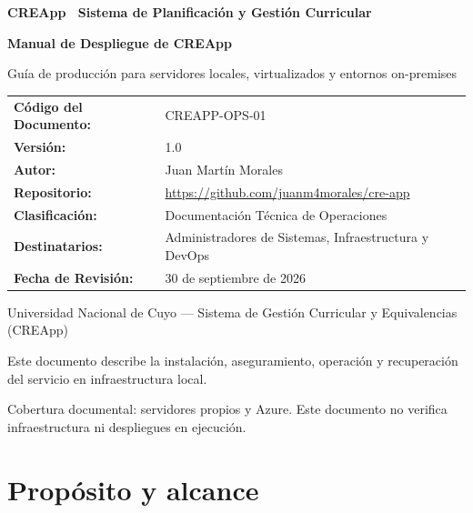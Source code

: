 \documentclass[10pt,a4paper,oneside]{article}
\begin{document}
\begin{titlepage}
\thispagestyle{empty}
\vspace*{1.5cm}
{\Large\bfseries\color{CREBlue} CREApp \textbar\ Sistema de Planificación y Gestión Curricular\par}
\vspace{1.2cm}
{\Huge\bfseries Manual de Despliegue de CREApp\par}
\vspace{0.6cm}
{\large\color{black!80} Guía de producción para servidores locales, virtualizados y entornos on-premises\par}
\vspace{1.0cm}
\noindent{\color{CREBlue}\rule{\textwidth}{1.5pt}}
\vspace{1.0cm}

\begin{table}[h]
\centering
\begin{tabular}{ll}
\toprule
\textbf{Código del Documento:} & CREAPP-OPS-01 \\
\textbf{Versión:} & 1.0 \\
\textbf{Autor:} & Juan Martín Morales \\
\textbf{Repositorio:} & \url{https://github.com/juanm4morales/cre-app} \\
\textbf{Clasificación:} & Documentación Técnica de Operaciones \\
\textbf{Destinatarios:} & Administradores de Sistemas, Infraestructura y DevOps \\
\textbf{Fecha de Revisión:} & 30 de septiembre de 2026 \\
\bottomrule
\end{tabular}
\end{table}

\vfill
{\small\color{black!70}
Universidad Nacional de Cuyo --- Sistema de Gestión Curricular y Equivalencias (CREApp)\par
Este documento describe la instalación, aseguramiento, operación y recuperación del servicio en infraestructura local.
\par\vspace{0.25em}
Cobertura documental: servidores propios y Azure. Este documento no verifica infraestructura ni despliegues en ejecución.
}
\end{titlepage}
\tableofcontents
\clearpage
{}
\section*{Propósito y alcance}
\end{document}
